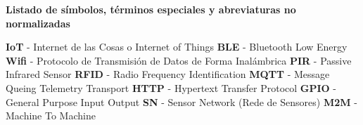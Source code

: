 \renewcommand{\thepage}{\Roman{page}}
    \textbf{\Large Listado de símbolos, términos especiales y abreviaturas no normalizadas}\newline

    \textbf{IoT} - Internet de las Cosas o Internet of Things
    \newline
    \textbf{BLE} - Bluetooth Low Energy
    \newline
    \textbf{Wifi} - Protocolo de Transmisión de Datos de Forma Inalámbrica
    \newline
    \textbf{PIR} - Passive Infrared Sensor
    \newline
    \textbf{RFID} - Radio Frequency Identification
    \newline
    \textbf{MQTT} - Message Queing Telemetry Transport
    \newline
    \textbf{HTTP} - Hypertext Transfer Protocol
    \newline
    \textbf{GPIO} - General Purpose Input Output
    \newline
    \textbf{SN} - Sensor Network (Rede de Sensores)
    \newline
    \textbf{M2M} - Machine To Machine
    
    \setcounter{page}{1}
    \thispagestyle{plain}
